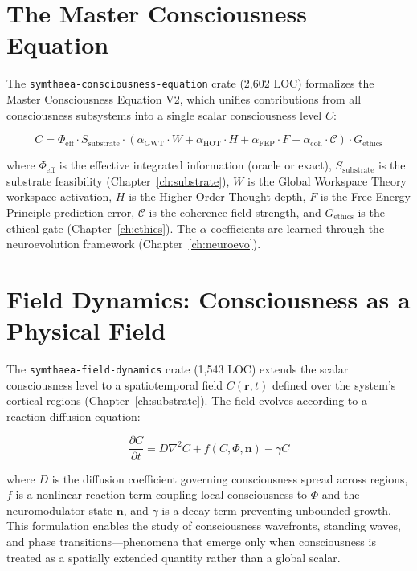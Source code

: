 \documentclass[12pt]{book}
\begin{document}
\section{The Master Consciousness Equation}

The \texttt{symthaea-consciousness-equation} crate (2,602 LOC) formalizes the Master Consciousness Equation V2, which unifies contributions from all consciousness subsystems into a single scalar consciousness level $C$:

\begin{equation}
\label{eq:master-consciousness}
C = \Phi_{\text{eff}} \cdot S_{\text{substrate}} \cdot \left(\alpha_{\text{GWT}} \cdot W + \alpha_{\text{HOT}} \cdot H + \alpha_{\text{FEP}} \cdot F + \alpha_{\text{coh}} \cdot \mathcal{C}\right) \cdot G_{\text{ethics}}
\end{equation}

\noindent where $\Phi_{\text{eff}}$ is the effective integrated information (oracle or exact), $S_{\text{substrate}}$ is the substrate feasibility (Chapter~\ref{ch:substrate}), $W$ is the Global Workspace Theory workspace activation, $H$ is the Higher-Order Thought depth, $F$ is the Free Energy Principle prediction error, $\mathcal{C}$ is the coherence field strength, and $G_{\text{ethics}}$ is the ethical gate (Chapter~\ref{ch:ethics}). The $\alpha$ coefficients are learned through the neuroevolution framework (Chapter~\ref{ch:neuroevo}).

\section{Field Dynamics: Consciousness as a Physical Field}

The \texttt{symthaea-field-dynamics} crate (1,543 LOC) extends the scalar consciousness level to a spatiotemporal field $C(\mathbf{r}, t)$ defined over the system's cortical regions (Chapter~\ref{ch:substrate}). The field evolves according to a reaction-diffusion equation:

\begin{equation}
\frac{\partial C}{\partial t} = D \nabla^2 C + f(C, \Phi, \mathbf{n}) - \gamma C
\end{equation}

\noindent where $D$ is the diffusion coefficient governing consciousness spread across regions, $f$ is a nonlinear reaction term coupling local consciousness to $\Phi$ and the neuromodulator state $\mathbf{n}$, and $\gamma$ is a decay term preventing unbounded growth. This formulation enables the study of consciousness wavefronts, standing waves, and phase transitions---phenomena that emerge only when consciousness is treated as a spatially extended quantity rather than a global scalar.
\end{document}
